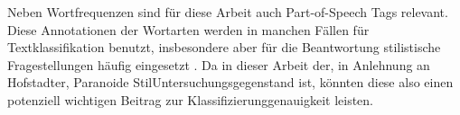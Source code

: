 Neben Wortfrequenzen sind für diese Arbeit auch Part-of-Speech Tags relevant.
Diese Annotationen der Wortarten werden in manchen Fällen für Textklassifikation benutzt, insbesondere aber für die Beantwortung stilistische Fragestellungen häufig eingesetzt \parencite[vgl.][]{jimenez_2020}.
Da in dieser Arbeit der, in Anlehnung an Hofstadter, Paranoide StilUntersuchungsgegenstand ist, könnten diese also einen potenziell wichtigen Beitrag zur Klassifizierunggenauigkeit leisten.